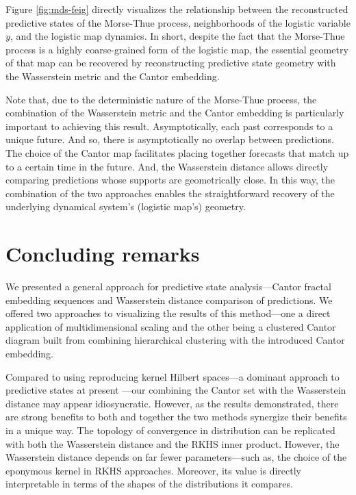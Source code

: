 \documentclass[sigconf, anonymous, review]{acmart}
\begin{document}
Figure \ref{fig:mds-feig} directly visualizes the relationship between the
reconstructed predictive states of the Morse-Thue process, neighborhoods of the
logistic variable $y$, and the logistic map dynamics. In short, despite the
fact that the Morse-Thue process is a highly coarse-grained form of the
logistic map, the essential geometry of that map can be recovered by
reconstructing predictive state geometry with the Wasserstein metric and the
Cantor embedding.

Note that, due to the deterministic nature of the Morse-Thue process, the
combination of the Wasserstein metric and the Cantor embedding is particularly
important to achieving this result. Asymptotically, each past corresponds to a
unique future. And so, there is asymptotically no overlap between predictions.
The choice of the Cantor map facilitates placing together forecasts that match
up to a certain time in the future. And, the Wasserstein distance allows
directly comparing predictions whose supports are geometrically close. In this
way, the combination of the two approaches enables the straightforward recovery
of the underlying dynamical system's (logistic map's) geometry.

\section{Concluding remarks}

We presented a general approach for predictive state analysis---Cantor fractal
embedding sequences and Wasserstein distance comparison of predictions. We
offered two approaches to visualizing the results of this method---one a direct
application of multidimensional scaling and the other being a clustered Cantor
diagram built from combining hierarchical clustering with the introduced Cantor
embedding.

Compared to using reproducing kernel Hilbert spaces---a dominant approach to
predictive states at present
\cite{Song09a,Song10a,Boot13a,Brod20a,Loom21a}---our combining the Cantor set
with the Wasserstein distance may appear idiosyncratic. However, as the results
demonstrated, there are strong benefits to both and together the two methods
synergize their benefits in a unique way. The topology of convergence in
distribution can be replicated with both the Wasserstein distance and the RKHS
inner product. However, the Wasserstein distance depends on far fewer
parameters---such as, the choice of the eponymous kernel in RKHS approaches.
Moreover, its value is directly interpretable in terms of the shapes of the
distributions it compares.
\end{document}
